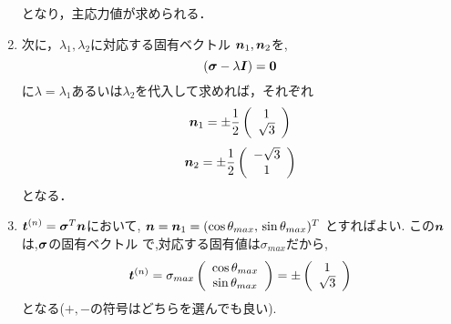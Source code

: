 \documentclass[10pt,a4j]{jarticle}
\begin{document}
\begin{enumerate}
\begin{equation}
\end{equation}
となり，主応力値が求められる．
\item
次に，$\lambda_1, \lambda_2$に対応する固有ベクトル
$\mbox{\boldmath $n$}_1,\mbox{\boldmath $n$}_2$を, 
\begin{equation}
	\left( \mbox{\boldmath $\sigma$}-\lambda \mbox{\boldmath $I$} \right)=\mbox{\boldmath $0$}	
\end{equation}
に$\lambda=\lambda_1$あるいは$\lambda_2$を代入して求めれば，それぞれ
\begin{equation}
	\mbox{\boldmath $n$}_1= 
	\pm \frac{1}{2}
	\left( 
		\begin{array}{c}
			1 \\
			\sqrt{3} 
		\end{array}
	\right)
\end{equation}
\begin{equation}
	\mbox{\boldmath $n$}_2= 
	\pm \frac{1}{2}
	\left( 
		\begin{array}{c}
			-\sqrt{3} \\
			1
		\end{array}
	\right)
\end{equation}
となる．
\item
$\mbox{\boldmath $t$}^{(n)}=\mbox{\boldmath $\sigma$}^T \mbox{\boldmath $n$}$において,  
$\mbox{\boldmath $n$}=\mbox{\boldmath $n$}_1=(\cos\theta_{max},\,\sin\theta_{max})^T$
とすればよい. この$\mbox{\boldmath $n$}$は,$\mbox{\boldmath $\sigma$}$の固有ベクトル
で,対応する固有値は$\sigma_{max}$だから,
\begin{equation}
	\mbox{\boldmath $t$}^{(n)}=\sigma_{max}
		\left(
		\begin{array}{c}
			\cos \theta_{max} \\	
			\sin \theta_{max} 
		\end{array}
		\right)
		=
		\pm
		\left(
		\begin{array}{c}
			1 \\
			\sqrt{3}
		\end{array}
		\right)
\end{equation}
となる($+,-$の符号はどちらを選んでも良い).
\end{enumerate}
\end{document}
